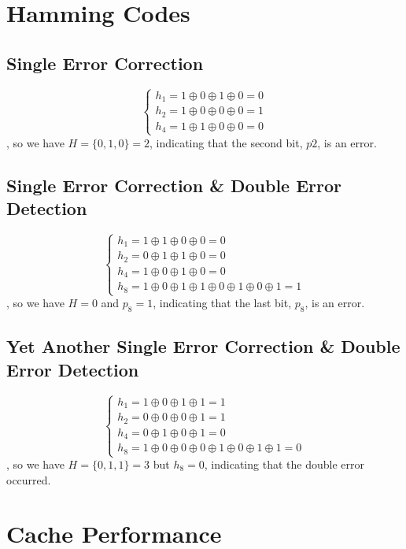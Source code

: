 \documentclass[12pt, a4paper]{article}
\begin{document}
\section{Hamming Codes}

\subsection{Single Error Correction}

$$
\left\{\begin{array}{l}
h_1=1\oplus0\oplus1\oplus0=0\\
h_2=1\oplus0\oplus0\oplus0=1\\
h_4=1\oplus1\oplus0\oplus0=0
\end{array}\right.
$$, so we have $H=\{0,1,0\}=2$, indicating that the second bit, $p2$, is an error.

\subsection{Single Error Correction \& Double Error Detection}

$$
\left\{\begin{array}{l}
h_1=1\oplus1\oplus0\oplus0=0\\
h_2=0\oplus1\oplus1\oplus0=0\\
h_4=1\oplus0\oplus1\oplus0=0\\
h_8=1\oplus0\oplus1\oplus1\oplus0\oplus1\oplus0\oplus1=1
\end{array}\right.
$$, so we have $H=0$ and $p_8=1$, indicating that the last bit, $p_8$, is an error.

\subsection{Yet Another Single Error Correction \& Double Error Detection}

$$
\left\{\begin{array}{l}
h_1=1\oplus0\oplus1\oplus1=1\\
h_2=0\oplus0\oplus0\oplus1=1\\
h_4=0\oplus1\oplus0\oplus1=0\\
h_8=1\oplus0\oplus0\oplus0\oplus1\oplus0\oplus1\oplus1=0
\end{array}\right.
$$, so we have $H=\{0,1,1\}=3$ but $h_8=0$, indicating that the double error occurred.

\section{Cache Performance}
\end{document}
